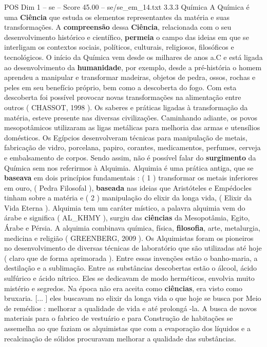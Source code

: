 \begin{textsample}{POS Dim 1 – se – Score 45.00 – se/se\_em\_14.txt}  \label{ex:f1_pos_085}
3.3.3 Química A Química é uma \textbf{Ciência} que estuda os elementos representantes da matéria e suas transformações.
A \textbf{compreensão} dessa \textbf{Ciência}, relacionada com o seu desenvolvimento histórico e científico, \textbf{permeia} o campo das ideias em que se interligam os contextos sociais, políticos, culturais, religiosos, filosóficos e tecnológicos.
O início da Química vem desde os milhares de anos a.C e está ligada ao desenvolvimento da \textbf{humanidade}, por exemplo, desde a pré-história o homem aprendeu a manipular e transformar madeiras, objetos de pedra, ossos, rochas e peles em seu benefício próprio, bem como a descoberta do fogo.
Com esta descoberta foi possível provocar novas transformações na alimentação entre outros ( CHASSOT, 1998 ).
Os saberes e práticas ligadas à transformação da matéria, esteve presente nas diversas civilizações.
Caminhando adiante, os povos mesopotâmicos utilizaram as ligas metálicas para melhoria das armas e utensílios domésticos.
Os Egípcios desenvolveram técnicas para manipulação de metais, fabricação de vidro, porcelana, papiro, corantes, medicamentos, perfumes, cerveja e embalsamento de corpos.
Sendo assim, não é possível falar do \textbf{surgimento} da Química sem nos referirmos à Alquimia.
Alquimia é uma prática antiga, que se \textbf{baseava} em dois princípios fundamentais : ( 1 ) transformar os metais inferiores em ouro, ( Pedra Filosofal ), \textbf{baseada} nas ideias que Aristóteles e Empédocles tinham sobre a matéria e ( 2 ) manipulação do elixir da longa vida, ( Elixir da Vida Eterna ).
Alquimia tem um caráter místico, a palavra alquimia vem do árabe e significa ( AL\_KHMY ), surgiu das \textbf{ciências} da Mesopotâmia, Egito, Árabe e Pérsia.
A alquimia combinava química, física, \textbf{filosofia}, arte, metalurgia, medicina e religião ( GREENBERG, 2009 ).
Os Alquimistas foram os pioneiros no desenvolvimento de diversas técnicas de laboratório que são utilizadas até hoje ( claro que de forma aprimorada ).
Entre essas invenções estão o banho-maria, a destilação e a sublimação.
Entre as substâncias descobertas estão o álcool, ácido sulfúrico e ácido nítrico.
Eles se dedicavam de modo herméticos, envolvia muito mistério e segredos.
Na época não era aceita como \textbf{ciências}, era visto como bruxaria. [... ] eles buscavam no elixir da longa vida o que hoje se busca por Meio de remédios : melhorar a qualidade de vida e até prolongá -la.
A busca de novos materiais para o fabrico de vestuário e para Construção de habitações se assemelha ao que faziam os alquimistas que com a evaporação dos líquidos e a recalcinação de sólidos procuravam melhorar a qualidade das substâncias.

\end{textsample}

